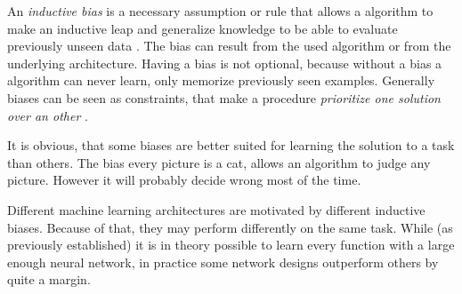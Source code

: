 An \emph{inductive bias} is a necessary assumption or rule that allows a algorithm to make an inductive leap and generalize knowledge to be able to evaluate previously unseen data \cite{needForBias}.
The bias can result from the used algorithm or from the underlying architecture.
Having a bias is not optional, because without a bias a algorithm can never \glqq learn\grqq{}, only memorize previously seen examples.
Generally biases can be seen as constraints, that make a procedure \emph{prioritize one solution over an other} \cite[]{relationalInductiveBiasesAndGraphNetworks}. 

It is obvious, that some biases are better suited for learning the solution to a task than others. 
The bias \glqq every picture is a cat\grqq{}, allows an algorithm to judge any picture. 
However it will probably decide wrong most of the time.

Different machine learning architectures are motivated by different inductive biases. 
Because of that, they may perform differently on the same task.
While (as previously established) it is in theory possible to learn every function with a large enough neural network, in practice some network designs outperform others by quite a margin.